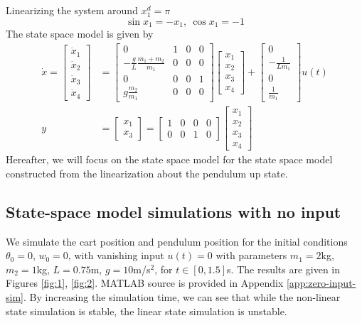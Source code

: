 \documentclass[12pt]{article}
\numberwithin{equation}{section}
\begin{document}
Linearizing the system around $x_1^d = \pi$
\begin{equation}
    \sin x_1 = - x_1,\ \cos x_1 = -1
\end{equation}
The state space model is given by
\begin{align}
    \dot{x}
    =
    \begin{bmatrix}
        \dot{x}_1\\
        \dot{x}_2\\
        \dot{x}_3\\
        \dot{x}_4
    \end{bmatrix}
    &=
    \begin{bmatrix}
        0 & 1 & 0 & 0\\
        -\frac{g}{L} \frac{m_1 + m_2}{m_1} & 0 & 0 & 0\\
        0 & 0 & 0 & 1\\
        g \frac{m_2}{m_1} & 0 & 0 & 0
    \end{bmatrix}
    \begin{bmatrix}
        x_1\\
        x_2\\
        x_3\\
        x_4
    \end{bmatrix}
    +
    \begin{bmatrix}
        0\\
        -\frac{1}{L m_1}\\
        0\\
        \frac{1}{m_1}
    \end{bmatrix}
    u(t)\\
    y
    &=
    \begin{bmatrix}
        x_1\\
        x_3
    \end{bmatrix}
    =
    \begin{bmatrix}
        1 & 0 & 0 & 0\\
        0 & 0 & 1 & 0
    \end{bmatrix}
    \begin{bmatrix}
        x_1\\
        x_2\\
        x_3\\
        x_4
    \end{bmatrix}
\end{align}
Hereafter, we will focus on the state space model for the state space model constructed from the linearization about the pendulum up state.

\subsection{State-space model simulations with no input}
\label{sec:sim-no-input}
We simulate the cart position and pendulum position for the initial conditions $\theta_0 = 0$, $w_0 = 0$, with vanishing input $u(t) = 0$ with parameters $m_1 = 2$kg, $m_2 = 1$kg, $L = 0.75$m, $g = 10$m/s${}^2$, for $t \in [0,1.5]$s. The results are given in Figures \ref{fig:1}, \ref{fig:2}. MATLAB source is provided in Appendix \ref{app:zero-input-sim}. By increasing the simulation time, we can see that while the non-linear state simulation is stable, the linear state simulation is unstable.
\end{document}
